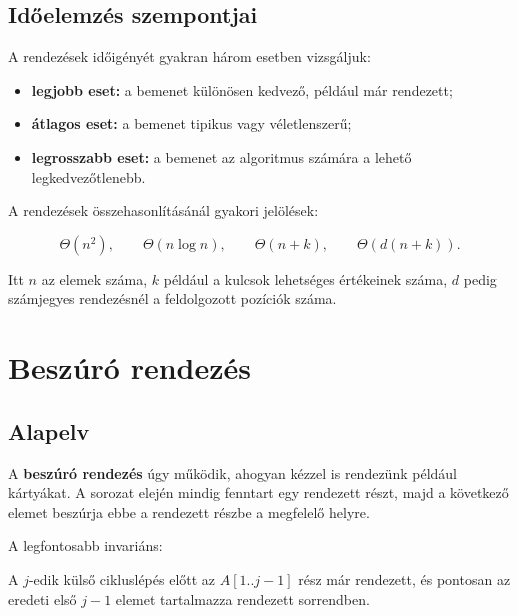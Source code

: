 \begin{center}

\end{center}



\subsection{Időelemzés szempontjai}

A rendezések időigényét gyakran három esetben vizsgáljuk:

\begin{itemize}
  \item \textbf{legjobb eset:} a bemenet különösen kedvező, például már rendezett;
  \item \textbf{átlagos eset:} a bemenet tipikus vagy véletlenszerű;
  \item \textbf{legrosszabb eset:} a bemenet az algoritmus számára a lehető legkedvezőtlenebb.
\end{itemize}

A rendezések összehasonlításánál gyakori jelölések:

\[
\Theta(n^2),\qquad \Theta(n\log n),\qquad \Theta(n+k),\qquad \Theta(d(n+k)).
\]

Itt $n$ az elemek száma, $k$ például a kulcsok lehetséges értékeinek száma, $d$ pedig számjegyes rendezésnél a feldolgozott pozíciók száma.

\section{Beszúró rendezés}

\subsection{Alapelv}

A \textbf{beszúró rendezés} úgy működik, ahogyan kézzel is rendezünk például kártyákat. A sorozat elején mindig fenntart egy rendezett részt, majd a következő elemet beszúrja ebbe a rendezett részbe a megfelelő helyre.

A legfontosabb invariáns:

\begin{summarybox}
A $j$-edik külső cikluslépés előtt az $A[1..j-1]$ rész már rendezett, és pontosan az eredeti első $j-1$ elemet tartalmazza rendezett sorrendben.
\end{summarybox}

